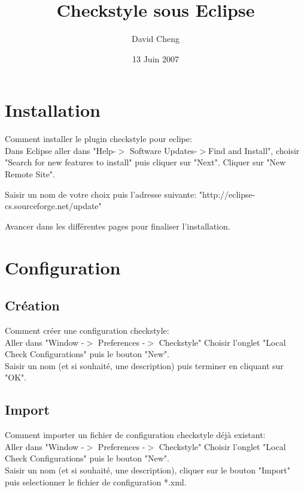\documentclass{article}
\title{Checkstyle sous Eclipse}
\author{David Cheng}
\date{13 Juin 2007}
\begin{document}
\maketitle


\section{Installation}
Comment installer le plugin checkstyle pour eclipe:\\

Dans Eclipse aller dans  "Help-$>$ Software Updates-$>$Find and Install",
choisir "Search for new features to install" puis cliquer sur "Next".  
Cliquer sur "New Remote Site".

Saisir un nom de votre choix puis l'adresse suivante: 
"http://eclipse-cs.sourceforge.net/update"

Avancer dans les diff\'erentes pages pour finaliser l'installation.

\section{Configuration}
\subsection{Cr\'eation}

Comment cr\'eer une configuration checkstyle:\\

Aller dans "Window -$>$ Preferences -$>$ Checkstyle"
Choisir l'onglet "Local Check Configurations"
puis le bouton "New".\\

Saisir un nom (et si souhait\'e, une description) puis terminer en cliquant sur "OK".



\subsection{Import}

Comment importer un fichier de configuration checkstyle d\'ej\`a existant:\\

Aller dans "Window -$>$ Preferences -$>$ Checkstyle"
Choisir l'onglet "Local Check Configurations"
puis le bouton "New".\\

Saisir un nom (et si souhait\'e, une description), cliquer sur le bouton "Import" 
puis selectionner le fichier de configuration *.xml.\\
\end{document}
